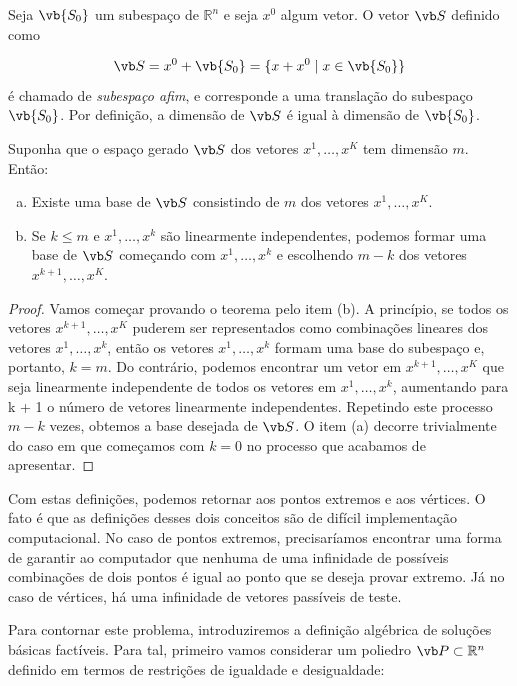 \begin{mydef}
Seja $\vb{S_0}$ um subespaço de $\mathbb{R}^n$ e seja $x^0$ algum vetor. O vetor $\vb S$ definido como

$$\vb S = x^0 + \vb{S_0} = \{x + x^0 \mid x \in \vb{S_0}\}$$
é chamado de \emph{subespaço afim}, e corresponde a uma translação do subespaço $\vb{S_0}$. Por definição, a dimensão de $\vb S$ é igual à dimensão de $\vb{S_0}$.
\end{mydef}

\begin{theorem}\label{teo:base}
Suponha que o espaço gerado $\vb S$ dos vetores $x^1,\ldots,x^K$ tem dimensão $m$. Então:
\begin{enumerate}[(a)]
\item Existe uma base de $\vb S$ consistindo de $m$ dos vetores $x^1,\ldots,x^K$.
\item Se $k\leq m$ e $x^1,\ldots,x^k$ são linearmente independentes, podemos formar uma base de $\vb S$ começando com $x^1,\ldots,x^k$ e escolhendo $m-k$ dos vetores $x^{k+1},\ldots,x^K$.
\end{enumerate}
\end{theorem}

\begin{proof}
Vamos começar provando o teorema pelo item (b). A princípio, se todos os vetores $x^{k+1},\ldots,x^K$ puderem ser representados como combinações lineares dos vetores $x^1,\ldots,x^k$, então os vetores $x^1,\ldots,x^k$ formam uma base do subespaço e, portanto, ${k = m}$. Do contrário, podemos encontrar um vetor em $x^{k+1},\ldots,x^K$ que seja linearmente independente de todos os vetores em $x^1,\ldots,x^k$, aumentando para k + 1 o número de vetores linearmente independentes. Repetindo este processo $m - k$ vezes, obtemos a base desejada de $\vb S$. O item (a) decorre trivialmente do caso em que começamos com $k = 0$ no processo que acabamos de apresentar.
\end{proof}

Com estas definições, podemos retornar aos pontos extremos e aos vértices. O fato é que as definições desses dois conceitos são de difícil implementação computacional. No caso de pontos extremos, precisaríamos encontrar uma forma de garantir ao computador que nenhuma de uma infinidade de possíveis combinações de dois pontos é igual ao ponto que se deseja provar extremo. Já no caso de vértices, há uma infinidade de vetores passíveis de teste.

Para contornar este problema, introduziremos a definição algébrica de soluções básicas factíveis. Para tal, primeiro vamos considerar um poliedro $\vb P \subset \mathbb{R}^n$ definido em termos de restrições de igualdade e desigualdade:

